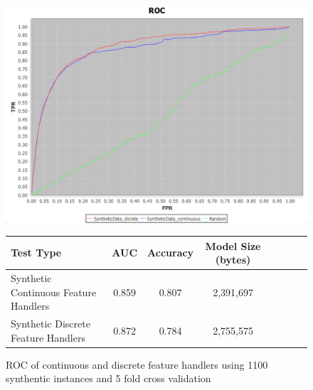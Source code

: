 \documentclass[a4paper,11pt]{scrreprt}
\begin{document}
\begin{figure}[h!]
\centering
\caption{ROC of continuous and discrete feature handlers using 1100 synthentic instances and 5 fold cross validation}
\includegraphics[scale=0.45, trim=0 -25 0 0, clip=true] {1000-instance-training-100-testing-synthetictest2.png}
\label{fig:indexes}
\begin{tabular}{l*{6}{c}r}
Test Type & AUC & Accuracy & Model Size (bytes)\\
\hline
Synthetic Continuous Feature Handlers & 0.859 & 0.807 & 2,391,697\\
Synthetic Discrete Feature Handlers & 0.872 & 0.784 & 2,755,575\\

\end{tabular}
\end{figure}
\clearpage
\end{document}
